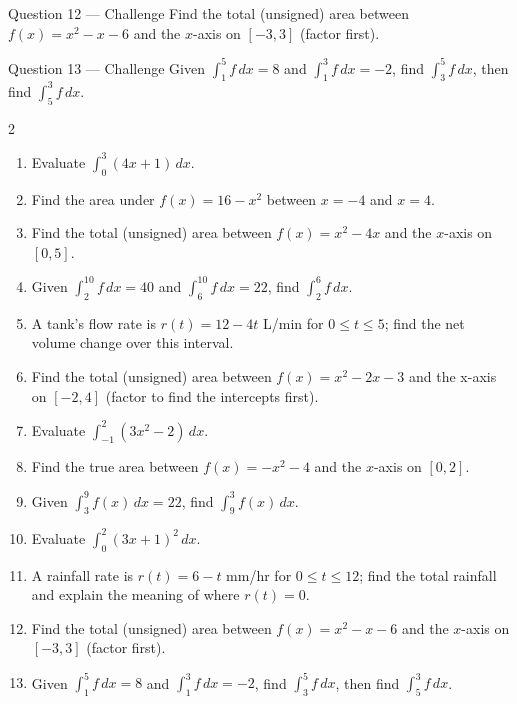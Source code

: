 \documentclass[11pt]{article}
\begin{document}
\begin{qbox}{Question 12 --- Challenge}
Find the total (unsigned) area between $f(x)=x^2-x-6$ and the $x$-axis on $[-3,3]$ (factor first).\workspace{3.4cm}
\end{qbox}

\begin{qbox}{Question 13 --- Challenge}
Given $\int_1^5f\,dx=8$ and $\int_1^3f\,dx=-2$, find $\int_3^5f\,dx$, then find $\int_5^3f\,dx$.\workspace{3.2cm}
\end{qbox}

\clearpage
{}

\begin{recapbox}
\begin{multicols}{2}
\small
\begin{enumerate}[leftmargin=*,itemsep=3pt]
  \item Evaluate $\displaystyle\int_0^3(4x+1)\,dx$.
  \item Find the area under $f(x)=16-x^2$ between $x=-4$ and $x=4$.
  \item Find the total (unsigned) area between $f(x)=x^2-4x$ and the $x$-axis on $[0,5]$.
  \item Given $\int_2^{10}f\,dx=40$ and $\int_6^{10}f\,dx=22$, find $\int_2^6f\,dx$.
  \item A tank's flow rate is $r(t)=12-4t$ L/min for $0\leq t\leq5$; find the net volume change over this interval.
  \item Find the total (unsigned) area between $f(x)=x^2-2x-3$ and the x-axis on $[-2,4]$ (factor to find the intercepts first).
  \item Evaluate $\displaystyle\int_{-1}^{2}(3x^2-2)\,dx$.
  \item Find the true area between $f(x)=-x^2-4$ and the $x$-axis on $[0,2]$.
  \item Given $\displaystyle\int_3^9f(x)\,dx=22$, find $\displaystyle\int_9^3f(x)\,dx$.
  \item Evaluate $\displaystyle\int_0^2(3x+1)^2\,dx$.
  \item A rainfall rate is $r(t)=6-t$ mm/hr for $0\leq t\leq12$; find the total rainfall and explain the meaning of where $r(t)=0$.
  \item Find the total (unsigned) area between $f(x)=x^2-x-6$ and the $x$-axis on $[-3,3]$ (factor first).
  \item Given $\int_1^5f\,dx=8$ and $\int_1^3f\,dx=-2$, find $\int_3^5f\,dx$, then find $\int_5^3f\,dx$.
\end{enumerate}
\end{multicols}
\end{recapbox}
\end{document}
